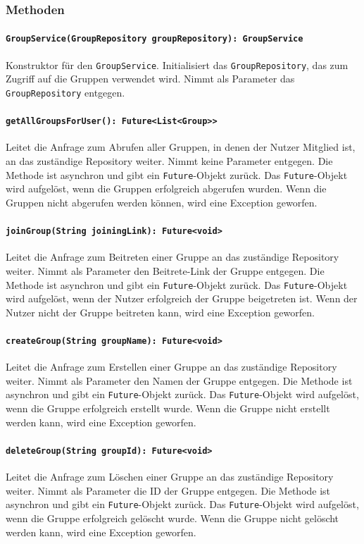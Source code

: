 \documentclass[parskip=full]{scrartcl}
\begin{document}
\subsubsection*{Methoden}
\paragraph{\texttt{GroupService(GroupRepository groupRepository): GroupService}}
Konstruktor für den \texttt{GroupService}. Initialisiert das \texttt{GroupRepository}, das zum Zugriff auf die Gruppen verwendet wird. Nimmt als Parameter das \texttt{GroupRepository} entgegen.
\paragraph{\texttt{getAllGroupsForUser(): Future<List<Group>>}}
Leitet die Anfrage zum Abrufen aller Gruppen, in denen der Nutzer Mitglied ist, an das zuständige Repository weiter. Nimmt keine Parameter entgegen. Die Methode ist asynchron und gibt ein \texttt{Future}-Objekt zurück. Das \texttt{Future}-Objekt wird aufgelöst, wenn die Gruppen erfolgreich abgerufen wurden. Wenn die Gruppen nicht abgerufen werden können, wird eine Exception geworfen.
\paragraph{\texttt{joinGroup(String joiningLink): Future<void>}}
Leitet die Anfrage zum Beitreten einer Gruppe an das zuständige Repository weiter. Nimmt als Parameter den Beitrete-Link der Gruppe entgegen. Die Methode ist asynchron und gibt ein \texttt{Future}-Objekt zurück. Das \texttt{Future}-Objekt wird aufgelöst, wenn der Nutzer erfolgreich der Gruppe beigetreten ist. Wenn der Nutzer nicht der Gruppe beitreten kann, wird eine Exception geworfen.
\paragraph{\texttt{createGroup(String groupName): Future<void>}}
Leitet die Anfrage zum Erstellen einer Gruppe an das zuständige Repository weiter. Nimmt als Parameter den Namen der Gruppe entgegen. Die Methode ist asynchron und gibt ein \texttt{Future}-Objekt zurück. Das \texttt{Future}-Objekt wird aufgelöst, wenn die Gruppe erfolgreich erstellt wurde. Wenn die Gruppe nicht erstellt werden kann, wird eine Exception geworfen.
\paragraph{\texttt{deleteGroup(String groupId): Future<void>}}
Leitet die Anfrage zum Löschen einer Gruppe an das zuständige Repository weiter. Nimmt als Parameter die ID der Gruppe entgegen. Die Methode ist asynchron und gibt ein \texttt{Future}-Objekt zurück. Das \texttt{Future}-Objekt wird aufgelöst, wenn die Gruppe erfolgreich gelöscht wurde. Wenn die Gruppe nicht gelöscht werden kann, wird eine Exception geworfen.
\end{document}
